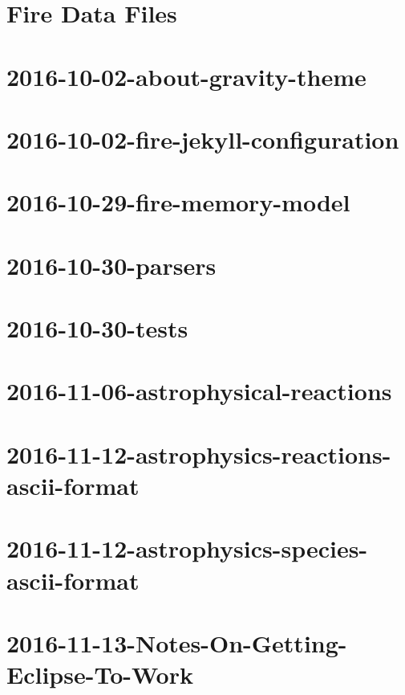 \documentclass[twoside]{book}
\newcommand{\+}{\discretionary{\mbox{\scriptsize$\hookleftarrow$}}{}{}}
\begin{document}
\chapter{Fire Data Files}
\label{a01919}

\chapter{2016-\/10-\/02-\/about-\/gravity-\/theme}
\label{a01920}

\chapter{2016-\/10-\/02-\/fire-\/jekyll-\/configuration}
\label{a01921}

\chapter{2016-\/10-\/29-\/fire-\/memory-\/model}
\label{a01922}

\chapter{2016-\/10-\/30-\/parsers}
\label{a01923}

\chapter{2016-\/10-\/30-\/tests}
\label{a01924}

\chapter{2016-\/11-\/06-\/astrophysical-\/reactions}
\label{a01925}

\chapter{2016-\/11-\/12-\/astrophysics-\/reactions-\/ascii-\/format}
\label{a01926}

\chapter{2016-\/11-\/12-\/astrophysics-\/species-\/ascii-\/format}
\label{a01927}

\chapter{2016-\/11-\/13-\/\+Notes-\/\+On-\/\+Getting-\/\+Eclipse-\/\+To-\/\+Work}
\label{a01928}

\end{document}
